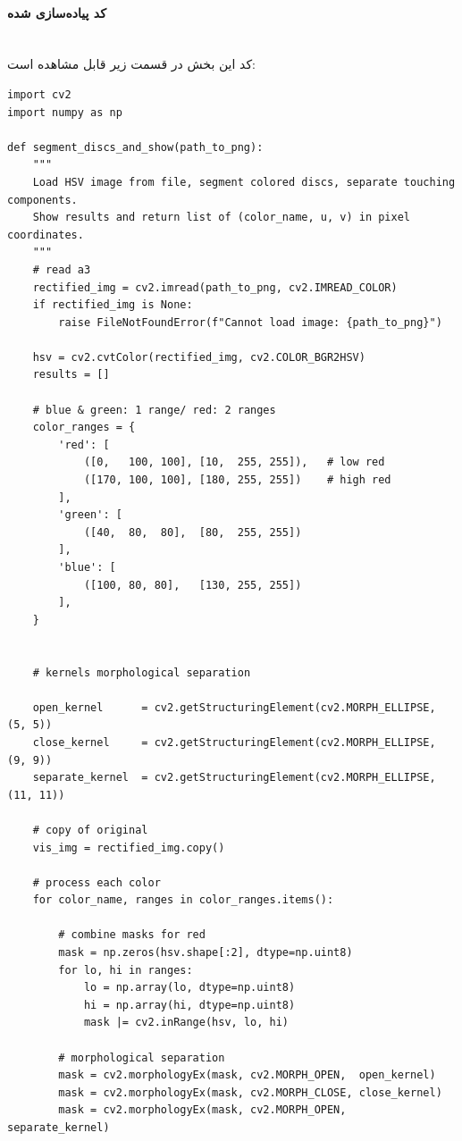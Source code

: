 \documentclass{article}
\begin{document}
\paragraph{کد پیاده‌سازی شده}\mbox{}\\
کد این بخش در قسمت زیر قابل مشاهده است:
\begin{latin}
\begin{LTR}
\begin{verbatim}
import cv2
import numpy as np

def segment_discs_and_show(path_to_png):
    """
    Load HSV image from file, segment colored discs, separate touching components.
    Show results and return list of (color_name, u, v) in pixel coordinates.
    """
    # read a3
    rectified_img = cv2.imread(path_to_png, cv2.IMREAD_COLOR)
    if rectified_img is None:
        raise FileNotFoundError(f"Cannot load image: {path_to_png}")

    hsv = cv2.cvtColor(rectified_img, cv2.COLOR_BGR2HSV)
    results = []

    # blue & green: 1 range/ red: 2 ranges
    color_ranges = {
        'red': [
            ([0,   100, 100], [10,  255, 255]),   # low red
            ([170, 100, 100], [180, 255, 255])    # high red
        ],
        'green': [
            ([40,  80,  80],  [80,  255, 255])
        ],
        'blue': [
            ([100, 80, 80],   [130, 255, 255])
        ],
    }


    # kernels morphological separation

    open_kernel      = cv2.getStructuringElement(cv2.MORPH_ELLIPSE, (5, 5))
    close_kernel     = cv2.getStructuringElement(cv2.MORPH_ELLIPSE, (9, 9))
    separate_kernel  = cv2.getStructuringElement(cv2.MORPH_ELLIPSE, (11, 11))

    # copy of original
    vis_img = rectified_img.copy()

    # process each color 
    for color_name, ranges in color_ranges.items():

        # combine masks for red
        mask = np.zeros(hsv.shape[:2], dtype=np.uint8)
        for lo, hi in ranges:
            lo = np.array(lo, dtype=np.uint8)
            hi = np.array(hi, dtype=np.uint8)
            mask |= cv2.inRange(hsv, lo, hi)

        # morphological separation
        mask = cv2.morphologyEx(mask, cv2.MORPH_OPEN,  open_kernel)
        mask = cv2.morphologyEx(mask, cv2.MORPH_CLOSE, close_kernel)
        mask = cv2.morphologyEx(mask, cv2.MORPH_OPEN,  separate_kernel)


\end{verbatim}
\end{LTR}
\end{latin}
\end{document}

